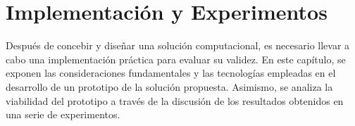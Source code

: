 \chapter{Implementación y Experimentos}\label{chapter:implementation}

Después de concebir y diseñar una solución computacional, es necesario llevar a cabo una implementación 
práctica para evaluar su validez. En este capítulo, se exponen las consideraciones fundamentales y 
las tecnologías empleadas en el desarrollo de un prototipo de la solución propuesta. Asimismo, se analiza 
la viabilidad del prototipo a través de la discusión de los resultados obtenidos en una serie de experimentos.

